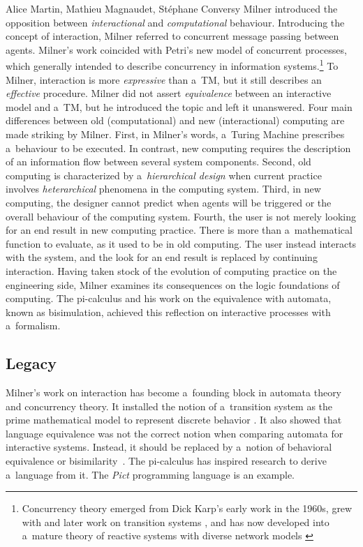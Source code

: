 \begin{artengenv2auth}{Alice Martin, Mathieu Magnaudet, Stéphane Conversy}
Milner introduced the opposition between \textit{interactional} and \textit{computational} behaviour. Introducing the concept of interaction, Milner \parencite*{Milner1975, Milner1982, Milner1983} referred to concurrent message passing between agents. Milner's work coincided with Petri’s \parencite*{Petri1980} new model of concurrent processes, which generally intended to describe concurrency in information systems.\footnote{Concurrency theory emerged from Dick Karp's early work in the 1960s, grew with \parencite{Petri1980} and later work on transition systems \parencite{Nielsen1981, Glabbeek2004},
and has now developed into a~mature theory of reactive systems \parencite{Harel1985} with diverse network models \parencites[for an overview, see][]{Lee1998}{Lee2006_modelsofcomputation}}
 To Milner, interaction is more \textit{expressive} than a~TM, but it still describes an \textit{effective} procedure. Milner did not assert \textit{equivalence} between an interactive model and a~TM, but he introduced the topic \parencite{Milner1999} and left it unanswered. 
Four main differences between old (computational) and new (interactional) computing are made striking by Milner. First, in Milner’s words, a~Turing Machine prescribes a~behaviour to be executed. In contrast, new computing requires the description of an information flow between several system components. Second, old computing is characterized by a~\textit{hierarchical design} when current practice involves \textit{heterarchical} phenomena in the computing system. Third, in new computing, the designer cannot predict when agents will be triggered or the overall behaviour of the computing system. Fourth, the user is not merely looking for an end result in new computing practice. There is more than a~mathematical function to evaluate, as it used to be in old computing. The user instead interacts with the system, and the look for an end result is replaced by continuing interaction. Having taken stock of the evolution of computing practice on the engineering side, Milner examines its consequences on the logic foundations of computing. The pi-calculus and his work on the equivalence with automata, known as bisimulation, achieved this reflection on interactive processes \parencite{Milner1993, Milner1999} with a~formalism.

\subsection{Legacy}

Milner's work on interaction has become a~founding block in automata theory and concurrency theory. It installed the notion of a~transition system as the prime mathematical model to represent discrete behavior \parencite{Nielsen1981, Baldan2001, Glabbeek2004, Arbach2015}. It also showed that language equivalence was not the correct notion when comparing automata for interactive systems.
Instead, it should be replaced by a~notion of behavioral equivalence or bisimilarity~\parencite{Milner1999}. The pi-calculus has inspired research to derive a~language from it. The \textit{Pict} \parencite{Pierce2000} programming language is an example. 


\end{artengenv2auth}
